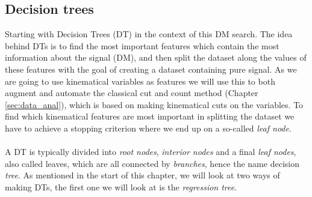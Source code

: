 \documentclass[12pt, a4paper]{book}
\begin{document}
\subsection{Decision trees}
Starting with Decision Trees (DT) in the context of this DM search. The idea behind DTs is to find the most important features which contain the most information about the signal (DM), and then split the dataset along the values of these features with the goal of creating a dataset containing pure signal. 
As we are going to use kinematical variables as features we will use this to both augment and automate the classical cut and count method (Chapter \ref{sec:data_anal}), which is based on making kinematical cuts on the variables. To find which kinematical features are most important 
in splitting the dataset we have to achieve a stopping criterion where we end up on a so-called \textit{leaf node}.\\
\\A DT is typically divided into \textit{root nodes}, \textit{interior nodes} and a final \textit{leaf nodes}, also called leaves, which are all connected by \textit{branches}, hence the name decision \textit{tree}. As mentioned in the start of this chapter, we will look at two ways of making DTs, 
the first one we will look at is the \textit{regression tree}. 
\end{document}

